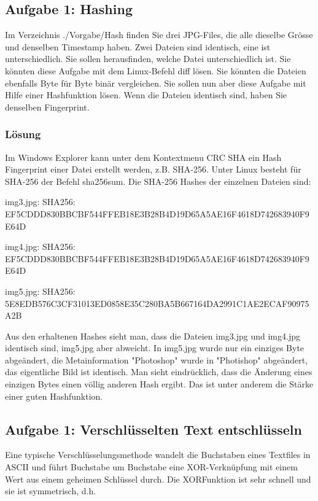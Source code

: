 \subsection{Aufgabe 1: Hashing}

Im Verzeichnis ./Vorgabe/Hash finden Sie drei JPG-Files, die alle dieselbe Grösse und denselben Timestamp
haben. Zwei Dateien sind identisch, eine ist unterschiedlich. Sie sollen herausfinden, welche Datei
unterschiedlich ist.
Sie könnten diese Aufgabe mit dem Linux-Befehl diff lösen. Sie könnten die Dateien ebenfalls Byte für
Byte binär vergleichen. Sie sollen nun aber diese Aufgabe mit Hilfe einer Hashfunktion lösen. Wenn die Dateien
identisch sind, haben Sie denselben Fingerprint.

\subsubsection{Lösung}
Im Windows Explorer kann unter dem Kontextmenu CRC SHA ein Hash Fingerprint einer Datei erstellt werden,
z.B. SHA-256. Unter Linux besteht für SHA-256 der Befehl sha256sum.
Die SHA-256 Hashes der einzelnen Dateien sind:

img3.jpg: SHA256: EF5CDDD830BBCBF544FFEB18E3B28B4D19D65A5AE16F4618D742683940F9E64D

img4.jpg: SHA256: EF5CDDD830BBCBF544FFEB18E3B28B4D19D65A5AE16F4618D742683940F9E64D

img5.jpg: SHA256: 5E8EDB576C3CF31013ED0858E35C280BA5B667164DA2991C1AE2ECAF90975A2B

Aus den erhaltenen Hashes sieht man, dass die Dateien img3.jpg und img4.jpg identisch sind, img5.jpg aber
abweicht. In img5.jpg wurde nur ein einziges Byte abgeändert, die Metainformation "Photoshop" wurde in
"Photishop" abgeändert, das eigentliche Bild ist identisch. Man sieht eindrücklich, dass die Änderung eines
einzigen Bytes einen völlig anderen Hash ergibt. Das ist unter anderem die Stärke einer guten Hashfunktion.

\subsection{Aufgabe 1: Verschlüsselten Text entschlüsseln}

Eine typische Verschlüsselungsmethode wandelt die Buchstaben eines Textfiles in ASCII und führt Buchstabe
um Buchstabe eine XOR-Verknüpfung mit einem Wert aus einem geheimen Schlüssel durch. Die XORFunktion
ist sehr schnell und sie ist symmetrisch, d.h.

